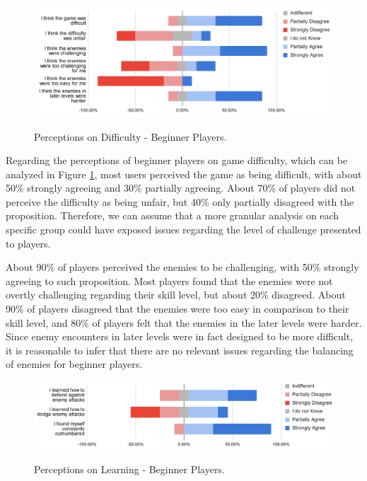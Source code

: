 \begin{figure}[ht]
    \begin{center}
    \caption{Perceptions on Difficulty - Beginner Players.}
        \includegraphics[width=36em]{figures/fig-perception-difficulty-beginner-players.png}
        \label{fig:perception-difficulty-beginner-players}
    \end{center}
\end{figure}

Regarding the perceptions of beginner players on game difficulty, which can be analyzed in Figure \ref{fig:perception-difficulty-beginner-players}, most users perceived the game as being difficult, with about 50\% strongly agreeing and 30\% partially agreeing. About 70\% of players did not perceive the difficulty as being unfair, but 40\% only partially disagreed with the proposition. Therefore, we can assume that a more granular analysis on each specific group could have exposed issues regarding the level of challenge presented to players.

About 90\% of players perceived the enemies to be challenging, with 50\% strongly agreeing to such proposition. Most players found that the enemies were not overtly challenging regarding their skill level, but about 20\% disagreed. About 90\% of players disagreed that the enemies were too easy in comparison to their skill level, and 80\% of players felt that the enemies in the later levels were harder. Since enemy encounters in later levels were in fact designed to be more difficult, it is reasonable to infer that there are no relevant issues regarding the balancing of enemies for beginner players. 

\begin{figure}[ht]
    \begin{center}
    \caption{Perceptions on Learning - Beginner Players.}
        \includegraphics[width=36em]{figures/fig-perception-learning-beginner-players.png}
        \label{fig:perception-learning-beginner-players}
    \end{center}
\end{figure}

